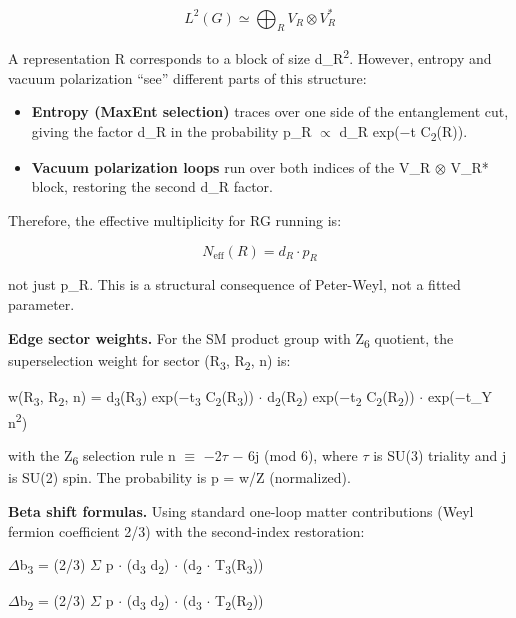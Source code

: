 \documentclass[11pt,a4paper]{article}
\theoremstyle{remark}
\begin{document}
\[
L^2(G) \simeq \bigoplus_R V_R \otimes V_R^*
\]

A representation R corresponds to a block of size d\_R\textsuperscript{2}. However, entropy and vacuum polarization ``see'' different parts of this structure:

\begin{itemize}
\item
  \textbf{Entropy (MaxEnt selection)} traces over one side of the entanglement cut, giving the factor d\_R in the probability p\_R \ensuremath{\propto} d\_R exp(\ensuremath{-}t C\textsubscript{2}(R)).
\item
  \textbf{Vacuum polarization loops} run over both indices of the V\_R \ensuremath{\otimes} V\_R* block, restoring the second d\_R factor.
\end{itemize}

Therefore, the effective multiplicity for RG running is:

\[
N_{\text{eff}}(R) = d_R \cdot p_R
\]

not just p\_R. This is a structural consequence of Peter-Weyl, not a fitted parameter.

\textbf{Edge sector weights.} For the SM product group with Z\textsubscript{6} quotient, the superselection weight for sector (R\textsubscript{3}, R\textsubscript{2}, n) is:

w(R\textsubscript{3}, R\textsubscript{2}, n) = d\textsubscript{3}(R\textsubscript{3}) exp(\ensuremath{-}t\textsubscript{3} C\textsubscript{2}(R\textsubscript{3})) \ensuremath{\cdot} d\textsubscript{2}(R\textsubscript{2}) exp(\ensuremath{-}t\textsubscript{2} C\textsubscript{2}(R\textsubscript{2})) \ensuremath{\cdot} exp(\ensuremath{-}t\_Y n\textsuperscript{2})

with the Z\textsubscript{6} selection rule n \ensuremath{\equiv} \ensuremath{-}2\ensuremath{\tau} \ensuremath{-} 6j (mod 6), where \ensuremath{\tau} is SU(3) triality and j is SU(2) spin. The probability is p = w/Z (normalized).

\textbf{Beta shift formulas.} Using standard one-loop matter contributions (Weyl fermion coefficient 2/3) with the second-index restoration:

\ensuremath{\Delta}b\textsubscript{3} = (2/3) \ensuremath{\Sigma} p \ensuremath{\cdot} (d\textsubscript{3} d\textsubscript{2}) \ensuremath{\cdot} (d\textsubscript{2} \ensuremath{\cdot} T\textsubscript{3}(R\textsubscript{3}))

\ensuremath{\Delta}b\textsubscript{2} = (2/3) \ensuremath{\Sigma} p \ensuremath{\cdot} (d\textsubscript{3} d\textsubscript{2}) \ensuremath{\cdot} (d\textsubscript{3} \ensuremath{\cdot} T\textsubscript{2}(R\textsubscript{2}))
\end{document}

